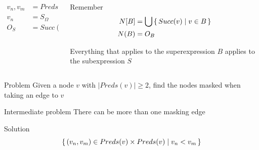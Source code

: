 \documentclass[xcolor = {dvipsnames, table}, aspectratio=169]{beamer}
\begin{document}
\begin{frame}
    \begin{columns}
        \begin{column}{0.5\textwidth}
            \begin{align*}
                { v_n, v_m } &= Preds(v) \\
                v_n &= S_\Omega \\
                O_S &=  Succ(v_n) \\
            \end{align*}
        \end{column}

        \begin{column}{0.5\textwidth}
            \begin{block}{Remember}
                \begin{align*}
                    N[B] &= \bigcup \set{Succ(v) \mid v \in B} \\
                    N(B) &= O_B \\
                \end{align*}
            \end{block}

            Everything that applies to the superexpression $B$ applies to the
            subexpression $S$
        \end{column}
    \end{columns}
\end{frame}

\begin{frame}
    \begin{block}{Problem}
        Given a node $v$ with $|Preds(v)| \geq 2$, find the nodes masked when
        taking an edge to $v$
    \end{block}

    \begin{block}{Intermediate problem}
        There can be more than one masking edge
    \end{block}

    \begin{block}{Solution}
        \begin{equation*}
            \set{(v_n, v_m) \in Preds(v) \times Preds(v) \mid v_n < v_m}
        \end{equation*}
    \end{block}
\end{frame}
\end{document}
